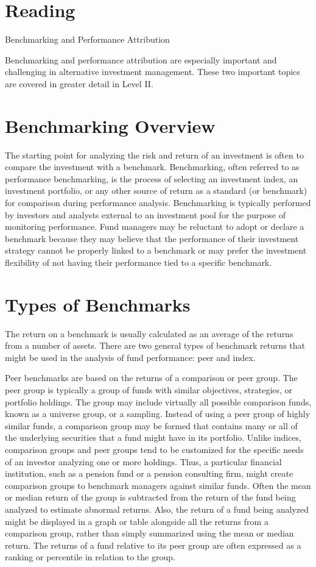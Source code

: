 \documentclass[11pt]{article}
\begin{document}
\section*{Reading}
Benchmarking and Performance Attribution

Benchmarking and performance attribution are especially important and challenging in alternative investment management. These two important topics are covered in greater detail in Level II.

\section*{Benchmarking Overview}
The starting point for analyzing the risk and return of an investment is often to compare the investment with a benchmark. Benchmarking, often referred to as performance benchmarking, is the process of selecting an investment index, an investment portfolio, or any other source of return as a standard (or benchmark) for comparison during performance analysis. Benchmarking is typically performed by investors and analysts external to an investment pool for the purpose of monitoring performance. Fund managers may be reluctant to adopt or declare a benchmark because they may believe that the performance of their investment strategy cannot be properly linked to a benchmark or may prefer the investment flexibility of not having their performance tied to a specific benchmark.

\section*{Types of Benchmarks}
The return on a benchmark is usually calculated as an average of the returns from a number of assets. There are two general types of benchmark returns that might be used in the analysis of fund performance: peer and index.

Peer benchmarks are based on the returns of a comparison or peer group. The peer group is typically a group of funds with similar objectives, strategies, or portfolio holdings. The group may include virtually all possible comparison funds, known as a universe group, or a sampling. Instead of using a peer group of highly similar funds, a comparison group may be formed that contains many or all of the underlying securities that a fund might have in its portfolio. Unlike indices, comparison groups and peer groups tend to be customized for the specific needs of an investor analyzing one or more holdings. Thus, a particular financial institution, such as a pension fund or a pension consulting firm, might create comparison groups to benchmark managers against similar funds. Often the mean or median return of the group is subtracted from the return of the fund being analyzed to estimate abnormal returns. Also, the return of a fund being analyzed might be displayed in a graph or table alongside all the returns from a comparison group, rather than simply summarized using the mean or median return. The returns of a fund relative to its peer group are often expressed as a ranking or percentile in relation to the group.
\end{document}
